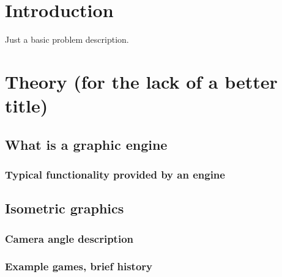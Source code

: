 \documentclass[11pt,oneside, final]{fithesis2}
\begin{document}
  
\FrontMatter  
\ThesisTitlePage  
 
\begin{ThesisDeclaration}  
\DeclarationText  
\AdvisorName  
\end{ThesisDeclaration}  
 
\begin{ThesisThanks}  

\end{ThesisThanks}  
 
\begin{ThesisAbstract}  

\end{ThesisAbstract}  
 
\begin{ThesisKeyWords}  

\end{ThesisKeyWords}  
 
\MainMatter
 
\tableofcontents          %
 
\chapter{Introduction}
Just a basic problem description.

\chapter{Theory (for the lack of a better title)}
\section{What is a graphic engine}
\subsection{Typical functionality provided by an engine}

\section{Isometric graphics}
\subsection{Camera angle description}
\subsection{Example games, brief history}
\end{document}
